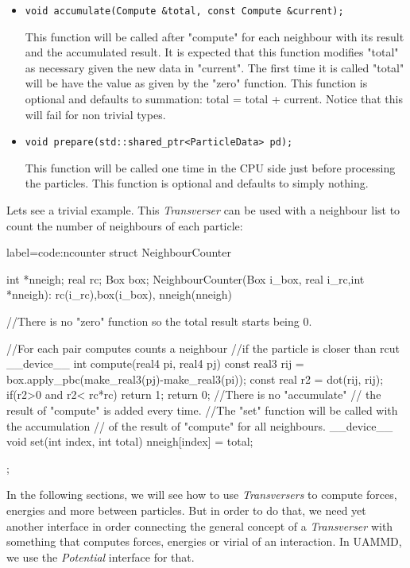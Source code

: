 \documentclass[ twoside,openright,titlepage,numbers=noenddot,%
headinclude,footinclude,cleardoublepage=empty,abstract=on,
BCOR=5mm,paper=a4,fontsize=11pt, dvipsnames
]{scrreprt}
\def\ucpp{uammd_cpp_lexer.py:UAMMDCppLexer -x}
\newcommand{\uammd}{\gls{UAMMD}\xspace}
\begin{document}
\begin{itemize}
 \item \texttt{void accumulate(Compute &total, const Compute &current);}

   
  This function will be called after "compute" for each neighbour with its result and the accumulated result.
  It is expected that this function modifies "total" as necessary given the new data in "current".
  The first time it is called "total" will be have the value as given by the "zero" function.
  This function is optional and defaults to summation: total = total + current. Notice that this will fail for non trivial types.
     
\item \texttt{void prepare(std::shared_ptr<ParticleData> pd);}

  
  This function will be called one time in the CPU side just before processing the particles.
  This function is optional and defaults to simply nothing.
 \end{itemize}

Lets see a trivial example.
This \emph{Transverser} can be used with a neighbour list to count the number of neighbours of each particle:
\begin{code2}{label=code:ncounter}
struct NeighbourCounter{
  int *nneigh;
  real rc;
  Box box;
  NeighbourCounter(Box i_box, real i_rc,int *nneigh):
    rc(i_rc),box(i_box),
    nneigh(nneigh){}

  //There is no "zero" function so the total result starts being 0.
  
  //For each pair computes counts a neighbour 
  //if the particle is closer than rcut
  __device__ int compute(real4 pi, real4 pj){
    const real3 rij = box.apply_pbc(make_real3(pj)-make_real3(pi));
    const real r2 = dot(rij, rij);
    if(r2>0 and r2< rc*rc){
      return 1;
    }
    return 0;
  }
  //There is no "accumulate"
  // the result of "compute" is added every time.
  //The "set" function will be called with the accumulation
  // of the result of "compute" for all neighbours. 
  __device__ void set(int index, int total){
    nneigh[index] = total;
  }
};
\end{code2}
In the following sections, we will see how to use \emph{Transversers} to compute forces, energies and more between particles.
But in order to do that, we need yet another interface in order connecting the general concept of a \emph{Transverser} with something that computes forces, energies or virial of an interaction. In \uammd, we use the \emph{Potential} interface for that.
\end{document}
